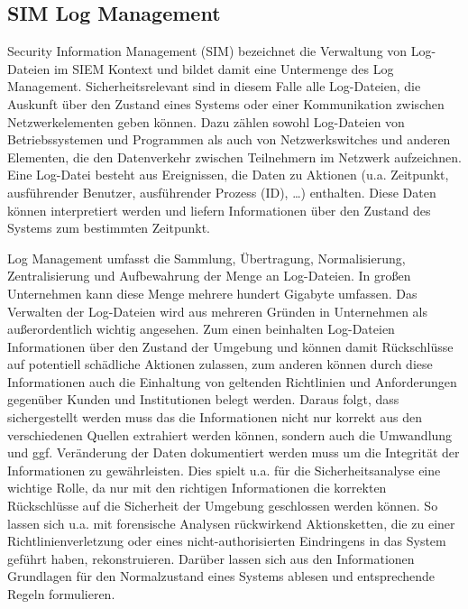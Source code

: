 \subsection{SIM \/ Log Management}
Security Information Management (SIM) bezeichnet die Verwaltung von Log-Dateien im SIEM Kontext und bildet damit eine Untermenge des Log Management. Sicherheitsrelevant sind in diesem Falle alle Log-Dateien, die Auskunft über den Zustand eines Systems oder einer Kommunikation zwischen Netzwerkelementen geben können. Dazu zählen sowohl Log-Dateien von Betriebssystemen und Programmen als auch von Netzwerkswitches und anderen Elementen, die den Datenverkehr zwischen Teilnehmern im Netzwerk aufzeichnen. Eine Log-Datei besteht aus Ereignissen, die Daten zu Aktionen (u.a. Zeitpunkt, ausführender Benutzer, ausführender Prozess (ID), …) enthalten. Diese Daten können interpretiert werden und liefern Informationen über den Zustand des Systems zum bestimmten Zeitpunkt.

Log Management umfasst die Sammlung, Übertragung, Normalisierung, Zentralisierung und Aufbewahrung der Menge an Log-Dateien. In großen Unternehmen kann diese Menge mehrere hundert Gigabyte umfassen. Das Verwalten der Log-Dateien wird aus mehreren Gründen in Unternehmen als außerordentlich wichtig angesehen. Zum einen beinhalten Log-Dateien Informationen über den Zustand der Umgebung und können damit Rückschlüsse auf potentiell schädliche Aktionen zulassen, zum anderen können durch diese Informationen auch die Einhaltung von geltenden Richtlinien und Anforderungen gegenüber Kunden und Institutionen belegt werden. Daraus folgt, dass sichergestellt werden muss das die Informationen nicht nur korrekt aus den verschiedenen Quellen extrahiert werden können, sondern auch die Umwandlung und ggf. Veränderung der Daten dokumentiert werden muss um die Integrität der Informationen zu gewährleisten. Dies spielt u.a. für die Sicherheitsanalyse eine wichtige Rolle, da nur mit den richtigen Informationen die korrekten Rückschlüsse auf die Sicherheit der Umgebung geschlossen werden können. So lassen sich u.a. mit forensische Analysen rückwirkend Aktionsketten, die zu einer Richtlinienverletzung oder eines nicht-authorisierten Eindringens in das System geführt haben, rekonstruieren. Darüber lassen sich aus den Informationen Grundlagen für den Normalzustand eines Systems ablesen und entsprechende Regeln formulieren.

